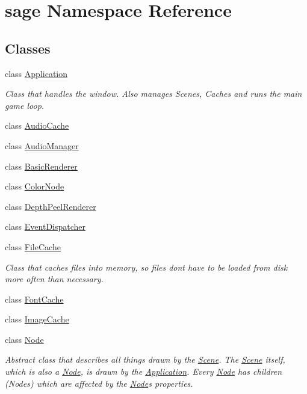 \hypertarget{namespacesage}{}\section{sage Namespace Reference}
\label{namespacesage}
\subsection*{Classes}
\begin{DoxyCompactItemize}
\item 
class \mbox{\hyperlink{classsage_1_1Application}{Application}}
\begin{DoxyCompactList}\small\item\em Class that handles the window. Also manages Scenes, Caches and runs the main game loop. \end{DoxyCompactList}\item 
class \mbox{\hyperlink{classsage_1_1AudioCache}{Audio\+Cache}}
\item 
class \mbox{\hyperlink{classsage_1_1AudioManager}{Audio\+Manager}}
\item 
class \mbox{\hyperlink{classsage_1_1BasicRenderer}{Basic\+Renderer}}
\item 
class \mbox{\hyperlink{classsage_1_1ColorNode}{Color\+Node}}
\item 
class \mbox{\hyperlink{classsage_1_1DepthPeelRenderer}{Depth\+Peel\+Renderer}}
\item 
class \mbox{\hyperlink{classsage_1_1EventDispatcher}{Event\+Dispatcher}}
\item 
class \mbox{\hyperlink{classsage_1_1FileCache}{File\+Cache}}
\begin{DoxyCompactList}\small\item\em Class that caches files into memory, so files don\textquotesingle{}t have to be loaded from disk more often than necessary. \end{DoxyCompactList}\item 
class \mbox{\hyperlink{classsage_1_1FontCache}{Font\+Cache}}
\item 
class \mbox{\hyperlink{classsage_1_1ImageCache}{Image\+Cache}}
\item 
class \mbox{\hyperlink{classsage_1_1Node}{Node}}
\begin{DoxyCompactList}\small\item\em Abstract class that describes all things drawn by the \mbox{\hyperlink{classsage_1_1Scene}{Scene}}. The \mbox{\hyperlink{classsage_1_1Scene}{Scene}} itself, which is also a \mbox{\hyperlink{classsage_1_1Node}{Node}}, is drawn by the \mbox{\hyperlink{classsage_1_1Application}{Application}}. Every \mbox{\hyperlink{classsage_1_1Node}{Node}} has children (Nodes) which are affected by the \mbox{\hyperlink{classsage_1_1Node}{Node}}\textquotesingle{}s properties. \end{DoxyCompactList}\item 

\end{DoxyCompactItemize}
